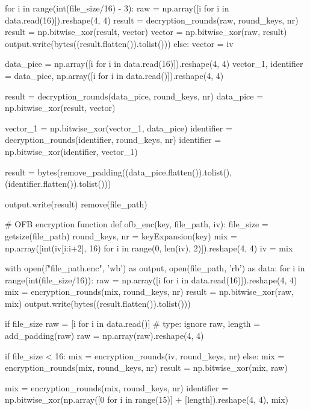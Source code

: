 \begin{python}
            for i in range(int(file_size/16) - 3):
                raw = np.array([i for i in data.read(16)]).reshape(4, 4)
                result = decryption_rounds(raw, round_keys, nr)
                result = np.bitwise_xor(result, vector)
                vector = np.bitwise_xor(raw, result)
                output.write(bytes((result.flatten()).tolist()))
        else:
            vector = iv

        data_pice = np.array([i for i in data.read(16)]).reshape(4, 4)
        vector_1, identifier = data_pice, np.array([i for i in data.read()]).reshape(4, 4)

        result = decryption_rounds(data_pice, round_keys, nr)
        data_pice = np.bitwise_xor(result, vector)

        vector_1 = np.bitwise_xor(vector_1, data_pice)
        identifier = decryption_rounds(identifier, round_keys, nr)
        identifier = np.bitwise_xor(identifier, vector_1)

        result = bytes(remove_padding((data_pice.flatten()).tolist(), (identifier.flatten()).tolist()))

        output.write(result)
    remove(file_path)


# OFB encryption function
def ofb_enc(key, file_path, iv):
    file_size = getsize(file_path)
    round_keys, nr = keyExpansion(key)
    mix = np.array([int(iv[i:i+2], 16) for i in range(0, len(iv), 2)]).reshape(4, 4)
    iv = mix

    with open(f"{file_path}.enc", 'wb') as output, open(file_path, 'rb') as data:
        for i in range(int(file_size/16)):
            raw = np.array([i for i in data.read(16)]).reshape(4, 4)
            mix = encryption_rounds(mix, round_keys, nr)
            result = np.bitwise_xor(raw, mix)
            output.write(bytes((result.flatten()).tolist()))

        if file_size %
            raw = [i for i in data.read()]  # type: ignore
            raw, length = add_padding(raw)
            raw = np.array(raw).reshape(4, 4)

            if file_size < 16:
                mix = encryption_rounds(iv, round_keys, nr)
            else:
                mix = encryption_rounds(mix, round_keys, nr)
            result = np.bitwise_xor(mix, raw)

            mix = encryption_rounds(mix, round_keys, nr)
            identifier = np.bitwise_xor(np.array([0 for i in range(15)] + [length]).reshape(4, 4), mix)


\end{python}
